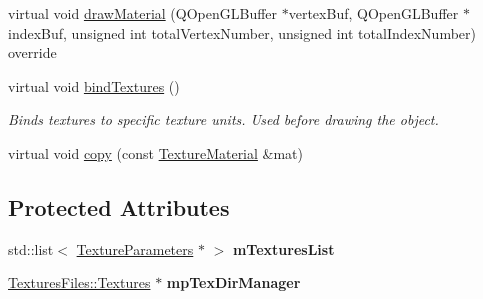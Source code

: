 \begin{DoxyCompactItemize}
\item 
virtual void \mbox{\hyperlink{class_geometry_engine_1_1_geometry_material_1_1_texture_material_a7bb3c956fa64e47b251d882890c931f9}{draw\+Material}} (Q\+Open\+G\+L\+Buffer $\ast$vertex\+Buf, Q\+Open\+G\+L\+Buffer $\ast$index\+Buf, unsigned int total\+Vertex\+Number, unsigned int total\+Index\+Number) override
\item 
\mbox{\label{class_geometry_engine_1_1_geometry_material_1_1_texture_material_aced804d28c51063e9541b88bbbb2b485}} 
virtual void \mbox{\hyperlink{class_geometry_engine_1_1_geometry_material_1_1_texture_material_aced804d28c51063e9541b88bbbb2b485}{bind\+Textures}} ()
\begin{DoxyCompactList}\small\item\em Binds textures to specific texture units. Used before drawing the object. \end{DoxyCompactList}\item 
virtual void \mbox{\hyperlink{class_geometry_engine_1_1_geometry_material_1_1_texture_material_a946658ad56ad140e6e5ec5d12a15affc}{copy}} (const \mbox{\hyperlink{class_geometry_engine_1_1_geometry_material_1_1_texture_material}{Texture\+Material}} \&mat)
\end{DoxyCompactItemize}
\subsection*{Protected Attributes}
\begin{DoxyCompactItemize}
\item 
\mbox{\label{class_geometry_engine_1_1_geometry_material_1_1_texture_material_ae2480940b9ea9c623ce3b68e5ccb28fe}} 
std\+::list$<$ \mbox{\hyperlink{class_geometry_engine_1_1_geometry_material_1_1_texture_parameters}{Texture\+Parameters}} $\ast$ $>$ {\bfseries m\+Textures\+List}
\item 
\mbox{\label{class_geometry_engine_1_1_geometry_material_1_1_texture_material_ae5437f3c43d11457400ea462809d5e33}} 
\mbox{\hyperlink{class_textures_files_1_1_textures}{Textures\+Files\+::\+Textures}} $\ast$ {\bfseries mp\+Tex\+Dir\+Manager}
\end{DoxyCompactItemize}
